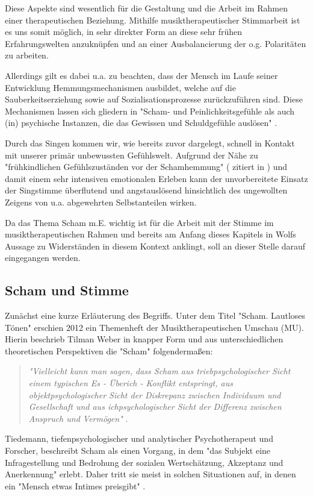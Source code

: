 Diese Aspekte sind wesentlich für die Gestaltung und die Arbeit im Rahmen einer therapeutischen Beziehung. Mithilfe musiktherapeutischer Stimmarbeit ist es uns somit möglich, in sehr direkter Form an diese sehr frühen Erfahrungswelten anzuknüpfen und an einer Ausbalancierung der o.g. Polaritäten zu arbeiten. 

Allerdings gilt es dabei u.a. zu beachten, dass der Mensch im Laufe seiner Entwicklung Hemmungsmechanismen ausbildet, welche auf die Sauberkeitserziehung sowie auf Sozialisationsprozesse zurückzuführen sind. Diese Mechanismen lassen sich gliedern in "Scham- und Peinlichkeitsgefühle als auch (in) psychische Instanzen, die das Gewissen und Schuldgefühle auslösen" \autocite [106f.]{rittner1990}. 

Durch das Singen kommen wir, wie bereits zuvor dargelegt, schnell in Kontakt mit unserer primär unbewussten Gefühlswelt. Aufgrund der Nähe zu "frühkindlichen Gefühlszuständen vor der Schamhemmung" (\cite{klausmeier1978} zitiert in \cite[107]{rittner1990}) und damit einem sehr intensiven emotionalen Erleben kann der unvorbereitete Einsatz der Singstimme überflutend und angstauslösend hinsichtlich des ungewollten Zeigens von u.a. abgewehrten Selbstanteilen wirken. 

Da das Thema Scham m.E. wichtig ist für die Arbeit mit der Stimme im musiktherapeutischen Rahmen und bereits am Anfang dieses Kapitels in Wolfs Aussage zu Widerständen in diesem Kontext anklingt, soll an dieser Stelle darauf eingegangen werden.

\subsection{Scham und Stimme}
Zunächst eine kurze Erläuterung des Begriffs. Unter dem Titel "Scham. Lautloses Tönen" erschien 2012 ein Themenheft der Musiktherapeutischen Umschau (MU). Hierin beschrieb Tilman Weber in knapper Form und aus unterschiedlichen theoretischen Perspektiven die "Scham" folgendermaßen:

\begin{quote}
\emph{"Vielleicht kann man sagen, dass Scham aus triebpsychologischer Sicht einem typischen Es - Überich - Konflikt entspringt, aus objektpsychologischer Sicht der Diskrepanz zwischen Individuum und Gesellschaft und aus ichpsychologischer Sicht der Differenz zwischen Anspruch und Vermögen"} \autocite[215]{weber2012}. 
\end{quote}

Tiedemann, tiefenpsychologischer und analytischer Psychotherapeut und Forscher, beschreibt Scham als einen Vorgang, in dem "das Subjekt eine Infragestellung und Bedrohung der sozialen Wertschätzung, Akzeptanz und Anerkennung" \autocite[219]{tiedemann2012} erlebt. Daher tritt sie meist in solchen Situationen auf, in denen ein "Mensch etwas Intimes preisgibt" \autocite[219]{tiedemann2012}. 

